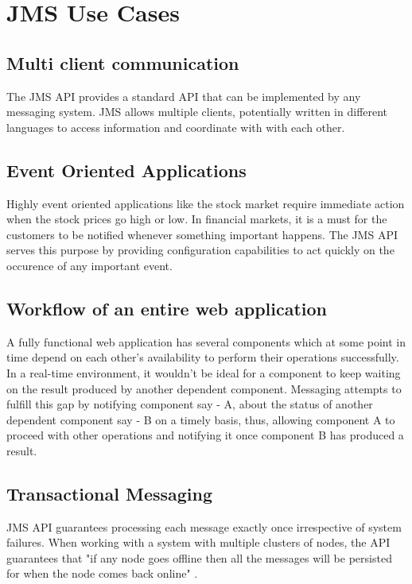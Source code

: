 \documentclass[9pt,twocolumn,twoside]{../../styles/osajnl}
\begin{document}
\section{JMS Use Cases}

\subsection{Multi client communication}

The JMS API provides a standard API that can be implemented by any
messaging system. JMS allows multiple clients, potentially written in
different languages to access information and coordinate with with
each other.

\subsection{Event Oriented Applications}

Highly event oriented applications like the stock market require
immediate action when the stock prices go high or low. In financial
markets, it is a must for the customers to be notified whenever
something important happens. The JMS API serves this purpose by
providing configuration capabilities to act quickly on the occurence
of any important event.

\subsection{Workflow of an entire web application}

A fully functional web application has several components which at
some point in time depend on each other's availability to perform
their operations successfully. In a real-time environment, it wouldn't
be ideal for a component to keep waiting on the result produced by
another dependent component. Messaging attempts to fulfill this gap by
notifying component say - A, about the status of another dependent
component say - B on a timely basis, thus, allowing component A to
proceed with other operations and notifying it once component B has
produced a result.

\subsection{Transactional Messaging}

JMS API guarantees processing each message exactly once irrespective
of system failures. When working with a system with multiple clusters
of nodes, the API guarantees that "if any node goes offline then all
the messages will be persisted for when the node comes back online"
\cite{www-activemq-usecases}.
\end{document}
